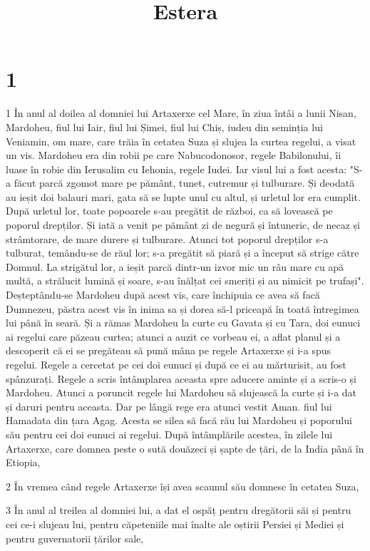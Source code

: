 

\title{Estera}


\chapter{1}

\par 1 În anul al doilea al domniei lui Artaxerxe cel Mare, în ziua întâi a lunii Nisan, Mardoheu, fiul lui Iair, fiul lui Șimei, fiul lui Chiș, iudeu din seminția lui Veniamin, om mare, care trăia în cetatea Suza și slujea la curtea regelui, a visat un vis. Mardoheu era din robii pe care Nabucodonosor, regele Babilonului, îi luase în robie din Ierusalim cu Iehonia, regele Iudei. Iar visul lui a fost acesta: "S-a făcut parcă zgomot mare pe pământ, tunet, cutremur și tulburare. Și deodată au ieșit doi balauri mari, gata să se lupte unul cu altul, și urletul lor era cumplit. După urletul lor, toate popoarele s-au pregătit de război, ca să lovească pe poporul drepților. Și iată a venit pe pământ zi de negură și întuneric, de necaz și strâmtorare, de mare durere și tulburare. Atunci tot poporul drepților s-a tulburat, temându-se de răul lor; s-a pregătit să piară și a început să strige către Domnul. La strigătul lor, a ieșit parcă dintr-un izvor mic un râu mare cu apă multă, a strălucit lumină și soare, s-au înălțat cei smeriți și au nimicit pe trufași". Deșteptându-se Mardoheu după acest vis, care închipuia ce avea să facă Dumnezeu, păstra acest vis în inima sa și dorea să-l priceapă în toată întregimea lui până în seară. Și a rămas Mardoheu la curte cu Gavata și cu Tara, doi eunuci ai regelui care păzeau curtea; atunci a auzit ce vorbeau ei, a aflat planul și a descoperit că ei se pregăteau să pună mâna pe regele Artaxerxe și i-a spus regelui. Regele a cercetat pe cei doi eunuci și după ce ei au mărturisit, au fost spânzurați. Regele a scris întâmplarea aceasta spre aducere aminte și a scris-o și Mardoheu. Atunci a poruncit regele lui Mardoheu să slujească la curte și i-a dat și daruri pentru aceasta. Dar pe lângă rege era atunci vestit Aman. fiul lui Hamadata din țara Agag. Acesta se silea să facă rău lui Mardoheu și poporului său pentru cei doi eunuci ai regelui. După întâmplările acestea, în zilele lui Artaxerxe, care domnea peste o sută douăzeci și șapte de țări, de la India până în Etiopia,
\par 2 În vremea când regele Artaxerxe își avea scaunul său domnesc în cetatea Suza,
\par 3 În anul al treilea al domniei lui, a dat el ospăț pentru dregătorii săi și pentru cei ce-i slujeau lui, pentru căpeteniile mai înalte ale oștirii Persiei și Mediei și pentru guvernatorii țărilor sale,
